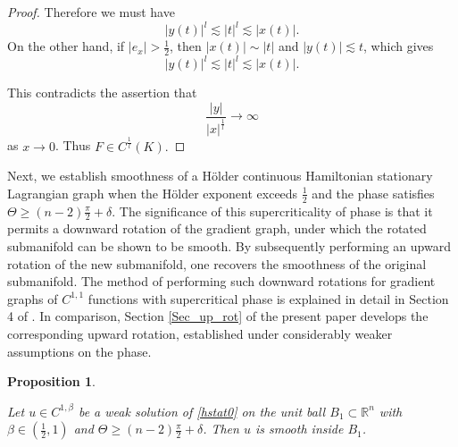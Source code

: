 \documentclass[12pt,reqno]{amsart}%
\theoremstyle{plain}
\newtheorem{proposition}[theorem]{Proposition}
\numberwithin{equation}{section}
\theoremstyle{definition}
\theoremstyle{remark}
\begin{document}
\begin{proof}
Therefore we must have $$|y(t)|^l \lesssim |t|^l \lesssim |x(t)|.$$ On the other hand, if $|e_x| > \frac 12$, then $|x(t) | \sim |t|$ and $|y(t) | \lesssim t $, which gives 
$$ |y(t)| ^l \lesssim |t|^l \lesssim |x(t)|.$$ 

This contradicts the assertion that 
$$ \frac{| y|}{|x|^{\frac 1 l } }  \to \infty $$
as $x \to 0$. Thus $F \in C^{ \frac 1 l } ( K) .$
\end{proof} 

Next, we establish smoothness of a Hölder continuous Hamiltonian stationary Lagrangian graph when the Hölder exponent exceeds $\frac{1}{2}$ and the phase satisfies $\Theta\geq(n-2)\frac{\pi}{2}+\delta$. The significance of this supercriticality of phase is that it permits a downward rotation of the gradient graph, under which the rotated submanifold can be shown to be smooth. By subsequently performing an upward rotation of the new submanifold, one recovers the smoothness of the original submanifold.  The method of performing such downward rotations for gradient graphs of $C^{1,1}$ functions with supercritical phase is explained in detail in Section 4 of \cite{ChenWarren}. In comparison, Section \ref{Sec_up_rot} of the present paper develops the corresponding upward rotation, established under considerably weaker assumptions on the phase. 
\begin{proposition} \label{Holder1/2to1}

Let $u \in C^{1, \beta}$ be a weak solution of \eqref{hstat0} on the unit ball $B_1\subset \mathbb{R}^n$ with $\beta \in (\frac12,1) $ and  $\Theta \geq (n-2)\frac{\pi}{2}+\delta$. Then $u$ is smooth inside $B_1$.
\end{proposition}
\end{document}
